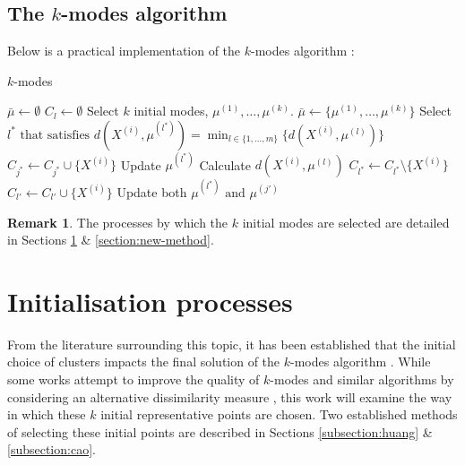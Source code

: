 \documentclass{article}
\theoremstyle{definition}
\newtheorem*{remark}{Remark}
\begin{document}
\subsection{The $k$-modes algorithm}\label{subsection:kmodes}

Below is a practical implementation of the $k$-modes algorithm \cite{Huang98}:

\begin{algorithm}[H]
\caption{$k$-modes}\label{alg:kmodes}
	\begin{algorithmic}[0] 
		\State $\bar{\mu} \gets \emptyset$
			\State $C_l \gets \emptyset$
		\EndFor
		\State Select $k$ initial modes, $\mu^{(1)}, \ldots, \mu^{(k)}$.
		\State $\bar{\mu} \gets \{\mu^{(1)}, \ldots, \mu^{(k)}\}$
			\State Select $l^* \text{ that satisfies } d(X^{(i)}, 
				\mu^{(l^*)}) = \min_{l \in \{1, \ldots, m\}} 
				\{d(X^{(i)}, \mu^{(l)})\}$
			\State $C_{j^*} \gets C_{j^*} \cup \{X^{(i)}\}$
			\State Update $\mu^{(l^*)}$
		\EndFor
		\Repeat
					\State Calculate $d(X^{(i)}, \mu^{(l)})$
				\EndFor
					\State $C_{l^*} \gets C_{l^*} \setminus
						\{X^{(i)}\}$
					\State $C_{l'} \gets C_{l'} \cup 
						\{X^{(i)}\}$
					\State Update both $\mu^{(l^*)} \text{ and } \mu^{(j')}$
				\EndIf
			\EndFor
	\end{algorithmic}
\end{algorithm}

\begin{remark}
	The processes by which the $k$ initial modes are selected are detailed in 
    Sections \ref{section:init} \& \ref{section:new-method}.
\end{remark}



\section{Initialisation processes}\label{section:init}

From the literature surrounding this topic, it has been established that the 
initial choice of clusters impacts the final solution of the $k$-modes algorithm 
\cite{Huang98}\cite{Cao09}. While some works attempt to improve the quality of 
$k$-modes and similar algorithms by considering an alternative dissimilarity 
measure \cite{Ng07}, this work will examine the way in which these $k$ initial 
representative points are chosen. Two established methods of selecting these 
initial points are described in Sections \ref{subsection:huang} \& 
\ref{subsection:cao}.
\end{document}

